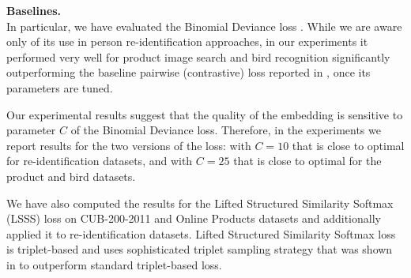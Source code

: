 {\bf Baselines.} \\
In particular, we have evaluated the Binomial Deviance loss  \citep{Yi14}. While we are aware only of its use in person re-identification approaches, in our experiments it performed very well for product image search and bird recognition significantly outperforming the baseline pairwise (contrastive) loss reported in \citep{Song16}, once its parameters are tuned. %



Our experimental results suggest that the quality of the embedding is sensitive to parameter $C$ of the Binomial Deviance loss. Therefore, in the experiments we report results for the two versions of the loss: with $C=10$ that is close to optimal for re-identification datasets, and with $C=25$ that is close to optimal for the product and bird datasets.

We have also computed the results for the Lifted Structured Similarity Softmax (LSSS) loss  \citep{Song16} on CUB-200-2011 \citep{Wah11} and Online Products \citep{Song16} datasets  and additionally applied it to  re-identification datasets. Lifted Structured Similarity Softmax loss is triplet-based and uses sophisticated triplet sampling strategy that was shown in \citep{Song16} to outperform standard triplet-based loss. 


